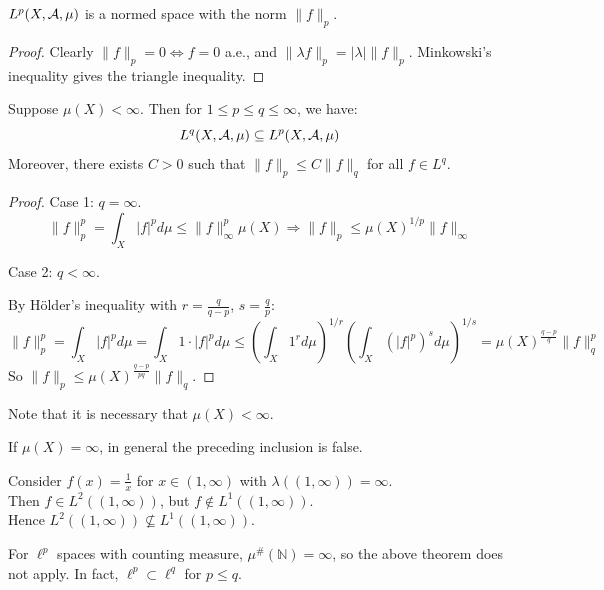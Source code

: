 \begin{corollary}
\( L^p(X, \mathcal{A}, \mu) \) is a normed space with the norm \( \|f\|_p \).
\end{corollary}

\begin{proof}
Clearly \( \|f\|_p = 0 \iff f = 0 \) a.e., and \( \|\lambda f\|_p = |\lambda| \|f\|_p \). Minkowski's inequality gives the triangle inequality.
\end{proof}

\clearpage
\begin{theorem}
Suppose \( \mu(X) < \infty \). Then for \( 1 \leq p \leq q \leq \infty \), we have:
\[
L^q(X, \mathcal{A}, \mu) \subseteq L^p(X, \mathcal{A}, \mu)
\]
Moreover, there exists \( C > 0 \) such that \( \|f\|_p \leq C \|f\|_q \) for all \( f \in L^q \).
\end{theorem}

\begin{proof}
Case 1: \( q = \infty \).
\[
\|f\|_p^p = \int_X |f|^p  d\mu \leq \|f\|_\infty^p \mu(X) \Rightarrow \|f\|_p \leq \mu(X)^{1/p} \|f\|_\infty
\]

Case 2: \( q < \infty \).

By Hölder's inequality with \( r = \frac{q}{q - p} \), \( s = \frac{q}{p} \):
\[
\|f\|_p^p = \int_X |f|^p  d\mu = \int_X 1 \cdot |f|^p  d\mu \leq \left( \int_X 1^r  d\mu \right)^{1/r} \left( \int_X (|f|^p)^s  d\mu \right)^{1/s} = \mu(X)^{\frac{q - p}{q}} \|f\|_q^p
\]
So \( \|f\|_p \leq \mu(X)^{\frac{q - p}{pq}} \|f\|_q \).
\end{proof}

\begin{remark}
Note that it is necessary that $\mu(X) < \infty$.

If $\mu(X) = \infty$, in general the preceding inclusion is false.

Consider $f(x) = \frac{1}{x}$ for $x \in (1, \infty)$ with $\lambda((1, \infty)) = \infty$. \\
Then $f \in L^2((1, \infty))$, but $f \notin L^1((1, \infty))$. \\
Hence $L^2((1, \infty)) \nsubseteq L^1((1, \infty))$.
\end{remark}

\begin{remark}
For \( \ell^p \) spaces with counting measure, \( \mu^{\#}(\mathbb{N}) = \infty \), so the above theorem does not apply. In fact, \( \ell^p \subset \ell^q \) for \( p \leq q \).
\end{remark}

